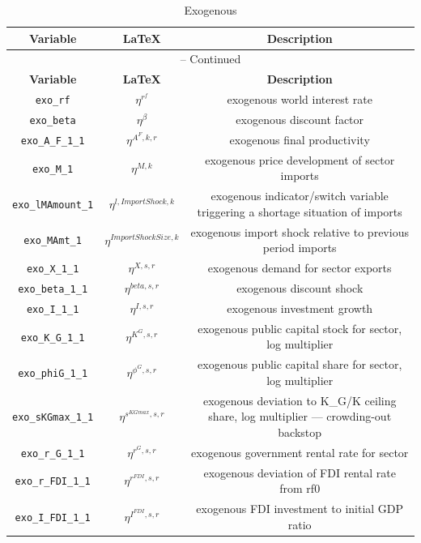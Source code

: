 \begin{center}
\begin{longtable}{ccc}
\caption{Exogenous}\\%
\hline%
\multicolumn{1}{c}{\textbf{Variable}} &
\multicolumn{1}{c}{\textbf{\LaTeX}} &
\multicolumn{1}{c}{\textbf{Description}}\\%
\hline\hline%
\endfirsthead
\multicolumn{3}{c}{{\tablename} \thetable{} -- Continued}\\%
\hline%
\multicolumn{1}{c}{\textbf{Variable}} &
\multicolumn{1}{c}{\textbf{\LaTeX}} &
\multicolumn{1}{c}{\textbf{Description}}\\%
\hline\hline%
\endhead
\texttt{exo\_rf} & ${\eta^{r^f}}$ & exogenous world interest rate\\
\texttt{exo\_beta} & ${\eta^{\beta}}$ & exogenous discount factor\\
\texttt{exo\_A\_F\_1\_1} & ${\eta^{A^F,k,r}}$ & exogenous final productivity\\
\texttt{exo\_M\_1} & ${\eta^{M,k}}$ & exogenous price development of sector imports\\
\texttt{exo\_lMAmount\_1} & ${\eta^{l,Import Shock,k}}$ & exogenous indicator/switch variable triggering a shortage situation of imports\\
\texttt{exo\_MAmt\_1} & ${\eta^{Import Shock Size,k}}$ & exogenous import shock relative to previous period imports\\
\texttt{exo\_X\_1\_1} & ${\eta^{X,s,r}}$ & exogenous demand for sector exports\\
\texttt{exo\_beta\_1\_1} & ${\eta^{beta,s,r}}$ & exogenous discount shock\\
\texttt{exo\_I\_1\_1} & ${\eta^{I,s,r}}$ & exogenous investment growth\\
\texttt{exo\_K\_G\_1\_1} & ${\eta^{K^G,s,r}}$ & exogenous public capital stock for sector, log multiplier\\
\texttt{exo\_phiG\_1\_1} & ${\eta^{\phi^{G},s,r}}$ & exogenous public capital share for sector, log multiplier\\
\texttt{exo\_sKGmax\_1\_1} & ${\eta^{s^{KGmax},s,r}}$ & exogenous deviation to K\_G/K ceiling share, log multiplier — crowding-out backstop\\
\texttt{exo\_r\_G\_1\_1} & ${\eta^{r^G,s,r}}$ & exogenous government rental rate for sector\\
\texttt{exo\_r\_FDI\_1\_1} & ${\eta^{r^{FDI},s,r}}$ & exogenous deviation of FDI rental rate from rf0\\
\texttt{exo\_I\_FDI\_1\_1} & ${\eta^{I^{FDI},s,r}}$ & exogenous FDI investment to initial GDP ratio\\

\end{longtable}
\end{center}
